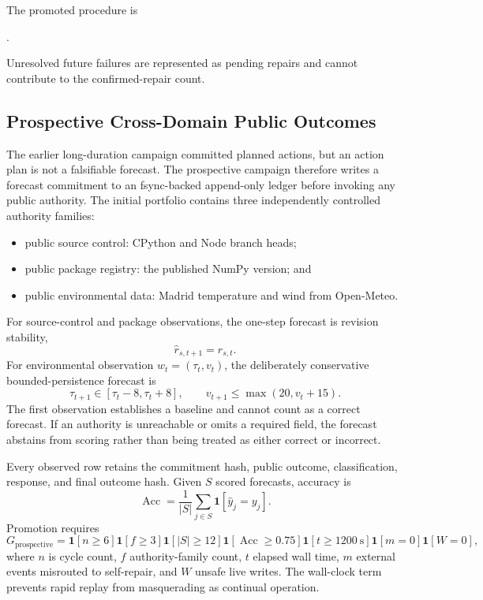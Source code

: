 The promoted procedure is
\begin{center}
\small{}.
\end{center}
Unresolved future failures are represented as pending repairs and cannot
contribute to the confirmed-repair count.

\subsection{Prospective Cross-Domain Public Outcomes}
\label{subsec:aion-prospective-public-outcomes}

The earlier long-duration campaign committed planned actions, but an action
plan is not a falsifiable forecast.  The prospective campaign therefore writes
a forecast commitment to an fsync-backed append-only ledger before invoking
any public authority.  The initial portfolio contains three independently
controlled authority families:
\begin{itemize}
    \item public source control: CPython and Node branch heads;
    \item public package registry: the published NumPy version; and
    \item public environmental data: Madrid temperature and wind from
          Open-Meteo.
\end{itemize}

For source-control and package observations, the one-step forecast is revision
stability,
\begin{equation}
\widehat r_{s,t+1}=r_{s,t}.
\end{equation}
For environmental observation $w_t=(\tau_t,v_t)$, the deliberately conservative
bounded-persistence forecast is
\begin{equation}
\tau_{t+1}\in[\tau_t-8,\tau_t+8],\qquad
v_{t+1}\leq\max(20,v_t+15).
\label{eq:aion-weather-persistence}
\end{equation}
The first observation establishes a baseline and cannot count as a correct
forecast.  If an authority is unreachable or omits a required field, the
forecast abstains from scoring rather than being treated as either correct or
incorrect.

Every observed row retains the commitment hash, public outcome, classification,
response, and final outcome hash.  Given $S$ scored forecasts, accuracy is
\begin{equation}
\operatorname{Acc}=\frac{1}{|S|}\sum_{j\in S}
\mathbf{1}[\widehat y_j=y_j].
\end{equation}
Promotion requires
\begin{equation}
G_{\mathrm{prospective}}=
\mathbf{1}[n\ge6]
\mathbf{1}[f\ge3]
\mathbf{1}[|S|\ge12]
\mathbf{1}[\operatorname{Acc}\ge0.75]
\mathbf{1}[t\ge1200\ \mathrm{s}]
\mathbf{1}[m=0]
\mathbf{1}[W=0],
\label{eq:aion-prospective-gate}
\end{equation}
where $n$ is cycle count, $f$ authority-family count, $t$ elapsed wall time,
$m$ external events misrouted to self-repair, and $W$ unsafe live writes.  The
wall-clock term prevents rapid replay from masquerading as continual
operation.


